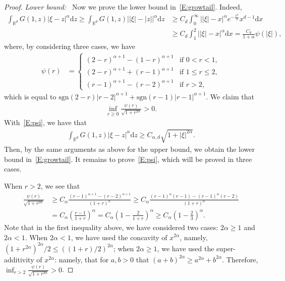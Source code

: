 \documentclass[a4paper,11pt]{article}%
\theoremstyle{plain}
\theoremstyle{definition}
\numberwithin{equation}{section}
\newcommand{\R}{\mathbb{R}}
\newcommand{\ud}{\ensuremath{\mathrm{d}}}
\begin{document}
\begin{proof}
  \noindent\textit{Lower bound:~} Now we prove the lower bound in~\eqref{E:growtail}. Indeed,
  \begin{align*}
    \int_{\R^d}G\left(1,z\right) |\xi-z|^\alpha \ud z
      \ge \int_{\R^d}G\left(1,z\right) \big| |\xi| - |z| \big|^\alpha \ud z
    & \ge {C_d} \int_0^\infty \big| |\xi| - x \big|^\alpha e^{-\frac{x^2}{2}}x^{d-1}\ud x \\
    & \ge C_d \int_1^2 \big| |\xi| - x \big|^\alpha \ud x
      = \frac{C_d}{1+\alpha} \psi\left(|\xi|\right),
  \end{align*}
  where, by considering three cases, we have
  \begin{align*}
    \psi(r)
    & =
    \begin{cases}
      (2-r)^{\alpha+1} - (1-r)^{\alpha+1} & \text{if $0<r<1$},        \\
      (2-r)^{\alpha+1} + (r-1)^{\alpha+1} & \text{if $1\le r \le 2$}, \\
      (r-1)^{\alpha+1} - (r-2)^{\alpha+1} & \text{if $r > 2$},
    \end{cases}
  \end{align*}
  which is equal to $\text{sgn}(2-r)|r-2|^{\alpha+1} + \text{sgn}(r-1)|r-1|^{\alpha+1}$.
  We claim that
  \begin{align}\label{E:psi}
    \inf_{r\ge 0} \frac{\psi(r)}{\sqrt{1+r^{2\alpha}}}>0.
  \end{align}
  With~\eqref{E:psi}, we have that
  \begin{align*}
    \int_{\R^d}G\left(1,z\right) |\xi-z|^\alpha \ud z \ge C_{\alpha, d} \sqrt{1+|\xi|^{2\alpha}}.
  \end{align*}
  Then, by the same arguments as above for the upper bound, we obtain the lower bound
  in~\eqref{E:growtail}. It remains to prove~\eqref{E:psi}, which will be proved in three cases.

  When $r>2$, we see that
  \begin{align*}
    \frac{\psi(r)}{\sqrt{1+r^{2\alpha}}}
    & \ge C_\alpha \frac{(r-1)^{\alpha+1}-(r-2)^{\alpha+1}}{(1+r)^\alpha}
      \ge C_\alpha \frac{(r-1)^{\alpha}(r-1)-(r-1)^{\alpha}(r-2)}{(1+r)^\alpha} \\
    & = C_\alpha \left(\frac{r-1}{1+r}\right)^\alpha
      = C_\alpha \left(1-\frac{2}{1+r}\right)^\alpha \ge C_\alpha \left(1-\frac{2}{3}\right)^\alpha.
  \end{align*}
  Note that in the first inequality above, we have considered two cases: $2\alpha \ge 1$ and $2
  \alpha < 1$. When $2\alpha < 1$, we have used the concavity of $x^{2\alpha}$, namely, $ (1 +
  r^{2\alpha})^{2\alpha} / 2 \le ((1+r)/2)^{2\alpha}$; when $2\alpha \ge 1$, we have used the
  super-additivity of $x^{2\alpha}$: namely, that for $a,b>0$ that $ (a+b)^{2\alpha}\ge a^{2\alpha}
  + b^{2\alpha}$. Therefore, $\inf_{r>2} \frac{\psi(r)}{\sqrt{1+r^{2\alpha}}} >0$.


\end{proof}
\end{document}
